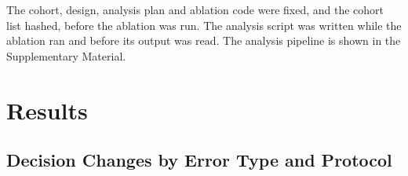 \documentclass[journal]{IEEEtran}
\begin{document}
The cohort, design, analysis plan and ablation code were fixed, and the cohort list hashed, before the ablation was
run. The analysis script was written while the ablation ran and before its output was read. The analysis
pipeline is shown in the Supplementary Material.

\section{Results}
\subsection{Decision Changes by Error Type and Protocol}
\end{document}
